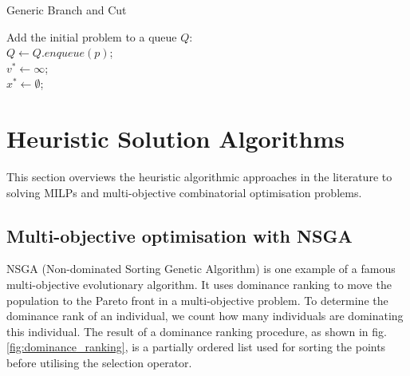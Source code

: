 \documentclass[mscthesis, 11pt]{usiinfthesis}
\theoremstyle{newdefinition}
\begin{document}
\begin{algorithm}
\caption{Generic Branch and Cut}\label{alg:b_and_c}
Add the initial problem to a queue $Q$:\\
$Q \gets Q.enqueue(p)$;\\
$v^* \gets \infty$;\\
$x^* \gets \emptyset$;\\
\end{algorithm}
\clearpage
\section{Heuristic Solution Algorithms}
This section overviews the heuristic algorithmic approaches in the literature to solving MILPs and multi-objective combinatorial optimisation problems.
\subsection{Multi-objective optimisation with NSGA}
NSGA (Non-dominated Sorting Genetic Algorithm) is one example of a famous multi-objective evolutionary algorithm. It uses dominance ranking to move the population to the Pareto front in a multi-objective problem. To determine the dominance rank of an individual, we count how many individuals are dominating this individual. The result of a dominance ranking procedure, as shown in fig. \ref{fig:dominance_ranking}, is a partially ordered list used for sorting the points before utilising the selection operator. \cite[~pp.~79--81]{coello_coello_basic_2007}
\end{document}

